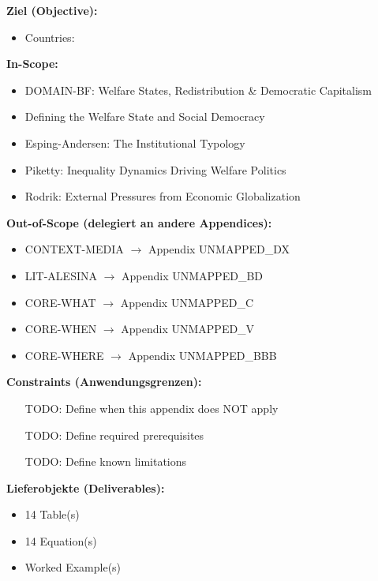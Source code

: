 \begin{tcolorbox}[
    colback=orange!5!white,
    colframe=orange!75!black,
    title={\textbf{Appendix Scope: Ziel / In-Scope / Out-of-Scope / Constraints}},
    fonttitle=\bfseries
]

\textbf{Ziel (Objective):}
\begin{itemize}[nosep]
    \item Countries:
\end{itemize}

\textbf{In-Scope:}
\begin{itemize}[nosep]
    \item DOMAIN-BF: Welfare States, Redistribution \& Democratic Capitalism
    \item Defining the Welfare State and Social Democracy
    \item Esping-Andersen: The Institutional Typology
    \item Piketty: Inequality Dynamics Driving Welfare Politics
    \item Rodrik: External Pressures from Economic Globalization
\end{itemize}

\textbf{Out-of-Scope (delegiert an andere Appendices):}
\begin{itemize}[nosep]
    \item CONTEXT-MEDIA $\rightarrow$ Appendix UNMAPPED_DX
    \item LIT-ALESINA $\rightarrow$ Appendix UNMAPPED_BD
    \item CORE-WHAT $\rightarrow$ Appendix UNMAPPED_C
    \item CORE-WHEN $\rightarrow$ Appendix UNMAPPED_V
    \item CORE-WHERE $\rightarrow$ Appendix UNMAPPED_BBB
\end{itemize}

\textbf{Constraints (Anwendungsgrenzen):}
\begin{itemize}[nosep]
    \item [TODO: Define when this appendix does NOT apply]
    \item [TODO: Define required prerequisites]
    \item [TODO: Define known limitations]
\end{itemize}

\textbf{Lieferobjekte (Deliverables):}
\begin{itemize}[nosep]
    \item 14 Table(s)
    \item 14 Equation(s)
    \item Worked Example(s)
\end{itemize}

\end{tcolorbox}


